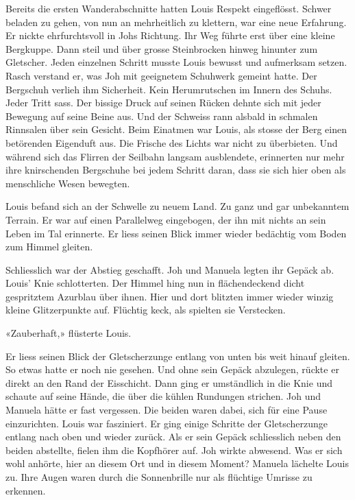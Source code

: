 Bereits die ersten Wanderabschnitte hatten Louis Respekt
eingeflösst. Schwer beladen zu gehen, von nun an mehrheitlich zu
klettern, war eine neue Erfahrung. Er nickte ehrfurchtsvoll in Johs
Richtung.
Ihr Weg führte erst über eine kleine Bergkuppe. Dann steil und über grosse
Steinbrocken hinweg hinunter zum Gletscher.
Jeden einzelnen Schritt musste Louis bewusst und aufmerksam setzen.
Rasch verstand er, was Joh mit geeignetem Schuhwerk gemeint hatte. Der
Bergschuh verlieh ihm Sicherheit. Kein Herumrutschen im Innern des
Schuhs. Jeder Tritt sass. Der bissige Druck auf seinen Rücken dehnte
sich mit jeder Bewegung auf seine Beine aus. Und der Schweiss rann
alsbald in schmalen Rinnsalen über sein Gesicht.
Beim Einatmen war Louis, als stosse der Berg einen betörenden Eigenduft
aus. Die Frische des Lichts war nicht zu überbieten. Und während sich
das Flirren der Seilbahn langsam ausblendete, erinnerten nur mehr ihre knirschenden Bergschuhe bei jedem Schritt daran, dass sie sich hier oben als menschliche Wesen bewegten. 

Louis befand sich an der Schwelle zu neuem Land. Zu ganz und gar
unbekanntem Terrain. Er war auf einen Parallelweg eingebogen, der ihn
mit nichts an sein Leben im Tal erinnerte. Er liess seinen
Blick immer wieder bedächtig vom Boden zum Himmel gleiten.

Schliesslich war der Abstieg geschafft. Joh und Manuela legten ihr
Gepäck ab. Louis’ Knie schlotterten.
Der Himmel hing nun in flächendeckend dicht gespritztem Azurblau über ihnen.
Hier und dort blitzten immer wieder winzig kleine Glitzerpunkte auf.
Flüchtig keck, als spielten sie Verstecken.

«Zauberhaft,» flüsterte Louis. 

Er liess seinen Blick der Gletscherzunge entlang von
unten bis weit hinauf gleiten. So etwas hatte er noch nie gesehen. Und
ohne sein Gepäck abzulegen, rückte er direkt an den Rand der Eisschicht.
Dann ging er umständlich in die Knie und schaute auf seine Hände, die
über die kühlen Rundungen strichen.
Joh und Manuela hätte er fast vergessen. Die beiden waren dabei, sich
für eine Pause einzurichten. Louis war fasziniert. Er ging einige
Schritte der Gletscherzunge entlang nach oben und wieder zurück. Als er
sein Gepäck schliesslich neben den beiden abstellte, fielen ihm die
Kopfhörer auf. Joh wirkte abwesend. Was er sich wohl anhörte, hier an
diesem Ort und in diesem Moment?
Manuela lächelte Louis zu. Ihre Augen waren durch die Sonnenbrille nur
als flüchtige Umrisse zu erkennen.

